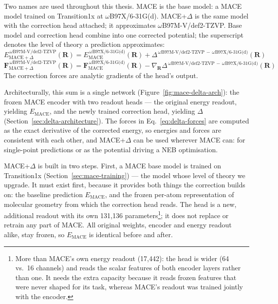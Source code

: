 Two names are used throughout this thesis. MACE is the base model: a
MACE model trained on Transition1x at \mbox{$\omega$B97X/6-31G(d)}.
MACE+$\Delta$ is the same model with the correction head attached; it
approximates \mbox{$\omega$B97M-V/def2-TZVP}. Base model and
correction head combine into one corrected potential; the superscript
denotes the level of theory a prediction approximates:
%
\begin{equation}
E_{\text{MACE}+\Delta}^{\,\omega\text{B97M-V/def2-TZVP}}(\mathbf{R})
=
E_{\text{MACE}}^{\,\omega\text{B97X/6-31G(d)}}(\mathbf{R})
+ \Delta^{\,\omega\text{B97M-V/def2-TZVP}\,-\,\omega\text{B97X/6-31G(d)}}(\mathbf{R})
\label{eq:delta-energy}
\end{equation}
%
\begin{equation}
\mathbf{F}_{\text{MACE}+\Delta}^{\,\omega\text{B97M-V/def2-TZVP}}(\mathbf{R})
=
\mathbf{F}_{\text{MACE}}^{\,\omega\text{B97X/6-31G(d)}}(\mathbf{R})
- \nabla_{\mathbf{R}}\Delta^{\,\omega\text{B97M-V/def2-TZVP}\,-\,\omega\text{B97X/6-31G(d)}}(\mathbf{R})
\label{eq:delta-forces}
\end{equation}
%
The correction forces are analytic gradients of the head's output.

Architecturally, this sum is a single network
(Figure~\ref{fig:mace-delta-arch}): the frozen MACE encoder with two
readout heads --- the original energy readout, yielding
$E_{\text{MACE}}$, and the newly trained correction head, yielding
$\Delta$ (Section~\ref{sec:delta-architecture}). The forces in
Eq.~\eqref{eq:delta-forces} are computed as the exact derivative of the
corrected energy, so energies and forces are consistent with each
other, and MACE+$\Delta$ can be used wherever MACE can: for
single-point predictions or as the potential driving a NEB
optimisation.

MACE+$\Delta$ is built in two steps. First, a MACE base model is trained on
Transition1x (Section~\ref{sec:mace-training}) --- the model whose level of theory we upgrade. It
must exist first, because it provides both things the correction builds on:
the baseline prediction $E_{\text{MACE}}$, and the frozen per-atom
representation of molecular geometry from which the correction head reads.
The head is a new, additional readout with its own 131{,}136
parameters\footnote{More than MACE's own energy readout (17{,}442): the head
is wider (64 vs.\ 16 channels) and reads the scalar features of both encoder
layers rather than one. It needs the extra capacity because it reads frozen
features that were never shaped for its task, whereas MACE's readout was
trained jointly with the encoder.}; it does not replace or retrain any part
of MACE. All original weights, encoder and energy readout alike, stay frozen,
so $E_{\text{MACE}}$ is identical before and after.

